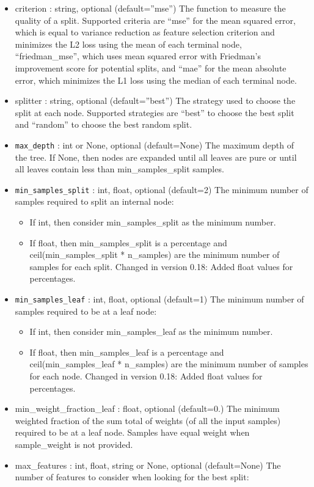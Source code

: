 \documentclass[11pt]{article}
\providecommand{\tightlist}{%
      \setlength{\itemsep}{0pt}\setlength{\parskip}{0pt}}
\begin{document}
\begin{itemize}
\tightlist
\item
  criterion : string, optional (default=''mse'') The function to measure
  the quality of a split. Supported criteria are ``mse'' for the mean
  squared error, which is equal to variance reduction as feature
  selection criterion and minimizes the L2 loss using the mean of each
  terminal node, ``friedman\_mse'', which uses mean squared error with
  Friedman's improvement score for potential splits, and ``mae'' for the
  mean absolute error, which minimizes the L1 loss using the median of
  each terminal node. 
\item
  splitter : string, optional (default=''best'') The strategy used to
  choose the split at each node. Supported strategies are ``best'' to
  choose the best split and ``random'' to choose the best random split. 
\item
  \texttt{max\_depth} : int or None, optional (default=None) The maximum
  depth of the tree. If None, then nodes are expanded until all leaves
  are pure or until all leaves contain less than min\_samples\_split
  samples. 
\item
  \texttt{min\_samples\_split} : int, float, optional (default=2) The
  minimum number of samples required to split an internal node:

  \begin{itemize}
  \tightlist
  \item
    If int, then consider min\_samples\_split as the minimum number.
  \item
    If float, then min\_samples\_split is a percentage and
    ceil(min\_samples\_split * n\_samples) are the minimum number of
    samples for each split. Changed in version 0.18: Added float values
    for percentages. 
  \end{itemize}
\item
  \texttt{min\_samples\_leaf} : int, float, optional (default=1) The
  minimum number of samples required to be at a leaf node:

  \begin{itemize}
  \tightlist
  \item
    If int, then consider min\_samples\_leaf as the minimum number.
  \item
    If float, then min\_samples\_leaf is a percentage and
    ceil(min\_samples\_leaf * n\_samples) are the minimum number of
    samples for each node. Changed in version 0.18: Added float values
    for percentages. 
  \end{itemize}
\item
  min\_weight\_fraction\_leaf : float, optional (default=0.) The minimum
  weighted fraction of the sum total of weights (of all the input
  samples) required to be at a leaf node. Samples have equal weight when
  sample\_weight is not provided. 
\item
  max\_features : int, float, string or None, optional (default=None)
  The number of features to consider when looking for the best split:


\end{itemize}
\end{document}
